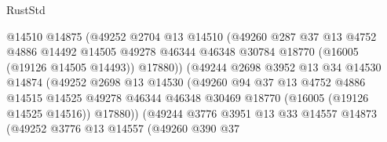 \begin{lexlean}{RustStd}
\begin{coremodule}
                                @14510
                                @14875
                                (@49252
                                  @2704
                                  @13
                                  @14510
                                  (@49260
                                    @287
                                    @37
                                    @13
                                    @4752
                                    @4886
                                    @14492
                                    @14505
                                    @49278
                                    @46344
                                    @46348
                                    @30784
                                    @18770
                                    (@16005 (@19126 @14505 @14493))
                                    @17880))
                                (@49244
                                  @2698
                                  @3952
                                  @13
                                  @34
                                  @14530
                                  @14874
                                  (@49252
                                    @2698
                                    @13
                                    @14530
                                    (@49260
                                      @94
                                      @37
                                      @13
                                      @4752
                                      @4886
                                      @14515
                                      @14525
                                      @49278
                                      @46344
                                      @46348
                                      @30469
                                      @18770
                                      (@16005 (@19126 @14525 @14516))
                                      @17880))
                                  (@49244
                                    @3776
                                    @3951
                                    @13
                                    @33
                                    @14557
                                    @14873
                                    (@49252
                                      @3776
                                      @13
                                      @14557
                                      (@49260
                                        @390
                                        @37

\end{coremodule}
\end{lexlean}
